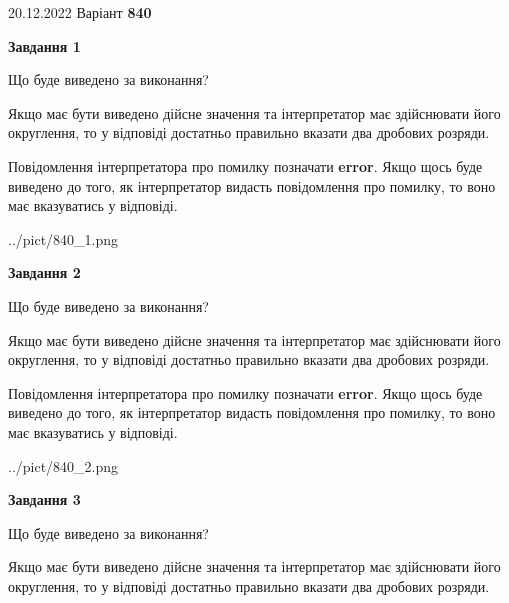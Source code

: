 \documentclass[12pt, ukrainian]{article}
\begin{document}
{20.12.2022 Варіант \No \textbf { 840 }\par}
{
\begin {Large}

{\begin {center}\textbf{Завдання 1}\end {center}}\par
Що буде виведено за виконання? \par

Якщо має бути виведено дійсне значення та інтерпретатор має здійснювати його округлення, 
то у відповіді достатньо правильно вказати два дробових розряди.

Повідомлення інтерпретатора про помилку позначати \textbf{error}.
Якщо щось буде виведено до того, як інтерпретатор видасть повідомлення про помилку, 
то воно має вказуватись у відповіді. \par

\begin{center}
	{../pict/840_1.png}
\end{center}
\newpage

{\begin {center}\textbf{Завдання 2}\end {center}}\par
Що буде виведено за виконання? \par

Якщо має бути виведено дійсне значення та інтерпретатор має здійснювати його округлення, 
то у відповіді достатньо правильно вказати два дробових розряди.

Повідомлення інтерпретатора про помилку позначати \textbf{error}.
Якщо щось буде виведено до того, як інтерпретатор видасть повідомлення про помилку, 
то воно має вказуватись у відповіді. \par

\begin{center}
	{../pict/840_2.png}
\end{center}
\newpage

{\begin {center}\textbf{Завдання 3}\end {center}}\par
Що буде виведено за виконання? \par

Якщо має бути виведено дійсне значення та інтерпретатор має здійснювати його округлення, 
то у відповіді достатньо правильно вказати два дробових розряди.


\end{Large}}
\end{document}
